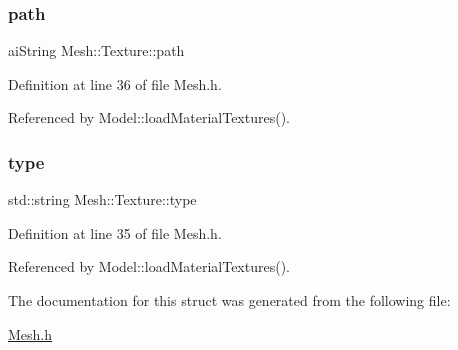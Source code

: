 \subsubsection{\texorpdfstring{path}{path}}
{\footnotesize\ttfamily ai\+String Mesh\+::\+Texture\+::path}



Definition at line 36 of file Mesh.\+h.



Referenced by Model\+::load\+Material\+Textures().

\mbox{\label{structMesh_1_1Texture_afd1b4cc8fd445ce46e2d5fe5f4238d84}} 
\subsubsection{\texorpdfstring{type}{type}}
{\footnotesize\ttfamily std\+::string Mesh\+::\+Texture\+::type}



Definition at line 35 of file Mesh.\+h.



Referenced by Model\+::load\+Material\+Textures().



The documentation for this struct was generated from the following file\+:\begin{DoxyCompactItemize}
\item 
\mbox{\hyperlink{Mesh_8h}{Mesh.\+h}}\end{DoxyCompactItemize}
